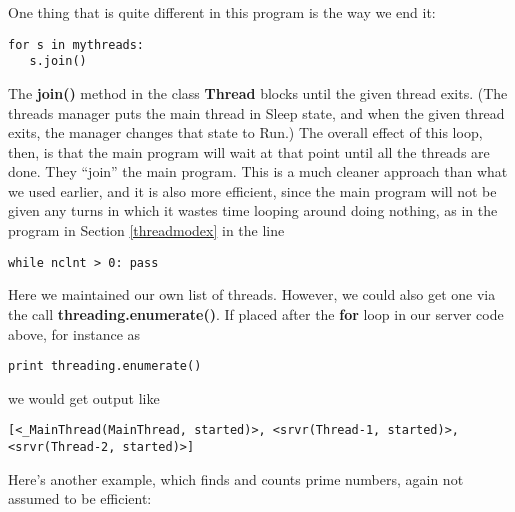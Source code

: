 One thing that is quite different in this program is the way we end
it:

\begin{Verbatim}[fontsize=\relsize{-2}]
for s in mythreads:
   s.join()
\end{Verbatim}

The {\bf join()} method in the class {\bf Thread} blocks until the given
thread exits.  (The threads manager puts the main thread in Sleep state,
and when the given thread exits, the manager changes that state to Run.)
The overall effect of this loop, then, is that the main program will
wait at that point until all the threads are done.  They ``join'' the
main program.  This is a much cleaner approach than what we used
earlier, and it is also more efficient, since the main program will not
be given any turns in which it wastes time looping around doing nothing,
as in the program in Section \ref{threadmodex} in the line

\begin{Verbatim}[fontsize=\relsize{-2}]
while nclnt > 0: pass
\end{Verbatim}

Here we maintained our own list of threads.  However, we could also get
one via the call {\bf threading.enumerate()}.  If placed after the {\bf
for} loop in our server code above, for instance as

\begin{Verbatim}[fontsize=\relsize{-2}]
print threading.enumerate()
\end{Verbatim}

we would get output like

\begin{Verbatim}[fontsize=\relsize{-2}]
[<_MainThread(MainThread, started)>, <srvr(Thread-1, started)>,
<srvr(Thread-2, started)>]
\end{Verbatim}

Here's another example, which finds and counts prime numbers, again not
assumed to be efficient:

